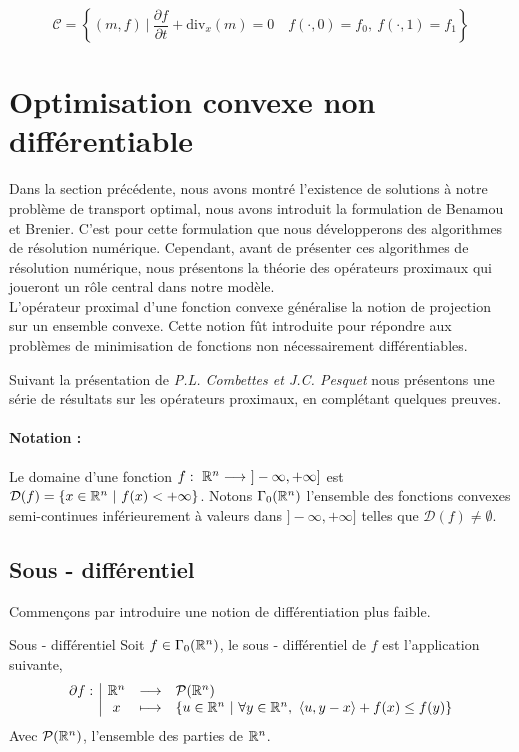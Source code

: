 \documentclass[a4paper,12pt]{article}
\renewcommand{\div}{\text{div}}
\begin{document}
\begin{equation}
\tag{C}
\mathcal{C}=\left\{(m,f)\ |\ \frac{\partial f}{\partial t} + \div_x(m)=0\quad f(\cdot,0)=f_0,\ f(\cdot,1)=f_1\right\}
\label{eq:constraint}
\end{equation}

\newpage
\section{Optimisation convexe non différentiable}
\label{sec:prox}
Dans la section précédente, nous avons montré l'existence de solutions à notre problème de transport optimal, nous avons introduit la formulation de Benamou et Brenier. C'est pour cette formulation que nous développerons des algorithmes de résolution numérique. Cependant, avant de présenter ces algorithmes de résolution numérique, nous présentons la théorie des opérateurs proximaux qui joueront un rôle central dans notre modèle. \\

L'opérateur proximal d'une fonction convexe généralise la notion de projection sur un ensemble convexe. Cette notion fût introduite pour répondre aux problèmes de minimisation de fonctions non nécessairement différentiables. 

Suivant la présentation de \emph{P.L. Combettes \emph{et} J.C. Pesquet} \cite{combettes} nous présentons une série de résultats sur les opérateurs proximaux, en complétant quelques preuves.
\paragraph{Notation :}Le domaine d'une fonction $f:\ \RR^n\longrightarrow\ ]-\infty,+\infty]$ est $\mathcal{D}(f) = \{ x\in\mathbb{R}^n\ |\ f(x) < +\infty \} $. Notons $\Gamma_0(\mathbb{R}^n)$ l'ensemble des fonctions convexes semi-continues inférieurement à valeurs dans $]-\infty,+\infty]$ telles que $\mathcal{D}(f) \neq \emptyset$. 
\subsection{Sous - différentiel}
Commençons par introduire une notion de différentiation plus faible. 
\begin{definition}{Sous - différentiel}
Soit $f\in\Gamma_0(\mathbb{R}^n)$, le sous - différentiel de $f$ est l'application suivante,
$$
\begin{array}[t]{l|ccl} \partial f: & \mathbb{R}^n & \longrightarrow & \mathcal{P}(\mathbb{R}^n) \\ & x & \longmapsto & \left\{ u\in\mathbb{R}^n\ |\ \forall y\in\mathbb{R}^n,\ \langle u,y-x\rangle +f(x)\leq f(y) \right\} \end{array}
$$ 
Avec $\mathcal{P}(\mathbb{R}^n)$, l'ensemble des parties de $\mathbb{R}^n$.
\end{definition}
\end{document}
